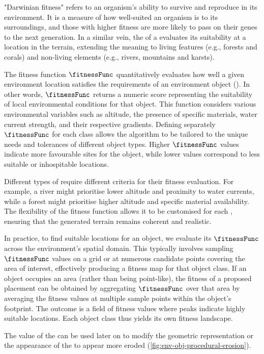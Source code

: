 "Darwinian fitness" refers to an organism's ability to survive and reproduce in its environment. It is a measure of how well-suited an organism is to its surroundings, and those with higher fitness are more likely to pass on their genes to the next generation. In a similar vein, the  of a  evaluates its suitability at a location in the terrain, extending the meaning to living features (e.g., forests and corals) and non-living elements (e.g., rivers, mountains and karsts).

The fitness function $\fitnessFunc$ quantitatively evaluates how well a given environment location satisfies the requirements of an environment object (). In other words, $\fitnessFunc$ returns a numeric score representing the suitability of local environmental conditions for that object. This function considers various environmental variables such as altitude, the presence of specific materials, water current strength, and their respective gradients. Defining separately $\fitnessFunc$ for each  class allows the algorithm to be tailored to the unique needs and tolerances of different object types. Higher $\fitnessFunc$ values indicate more favourable sites for the object, while lower values correspond to less suitable or inhospitable locations.

Different types of  require different criteria for their fitness evaluation. For example, a river might prioritise lower altitude and proximity to water currents, while a forest might prioritise higher altitude and specific material availability. The flexibility of the fitness function allows it to be customised for each , ensuring that the generated terrain remains coherent and realistic.

In practice, to find suitable locations for an object, we evaluate its $\fitnessFunc$ across the environment's spatial domain. This typically involves sampling $\fitnessFunc$ values on a grid or at numerous candidate points covering the area of interest, effectively producing a fitness map for that object class. If an object occupies an area (rather than being point-like), the fitness of a proposed placement can be obtained by aggregating $\fitnessFunc$ over that area by averaging the fitness values at multiple sample points within the object's footprint. The outcome is a field of fitness values where peaks indicate highly suitable locations. Each object class thus yields its own fitness landscape.

The value of the  can be used later on to modify the geometric representation or the appearance of the  to appear more eroded (\cref{fig:env-obj-procedural-erosion}).

